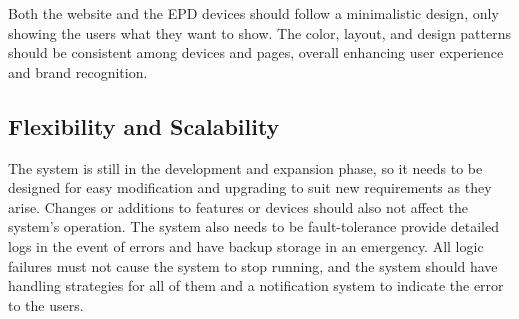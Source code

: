 \documentclass[../Main.tex]{subfiles}
\begin{document}
Both the website and the EPD devices should follow a minimalistic design, only showing the users what they want to show. The color, layout, and design patterns should be consistent among devices and pages, overall enhancing user experience and brand recognition.

\subsection{Flexibility and Scalability}
The system is still in the development and expansion phase, so it needs to be designed for easy modification and upgrading to suit new requirements as they arise. Changes or additions to features or devices should also not affect the system's operation. The system also needs to be fault-tolerance provide detailed logs in the event of errors and have backup storage in an emergency. All logic failures must not cause the system to stop running, and the system should have handling strategies for all of them and a notification system to indicate the error to the users.
\end{document}
